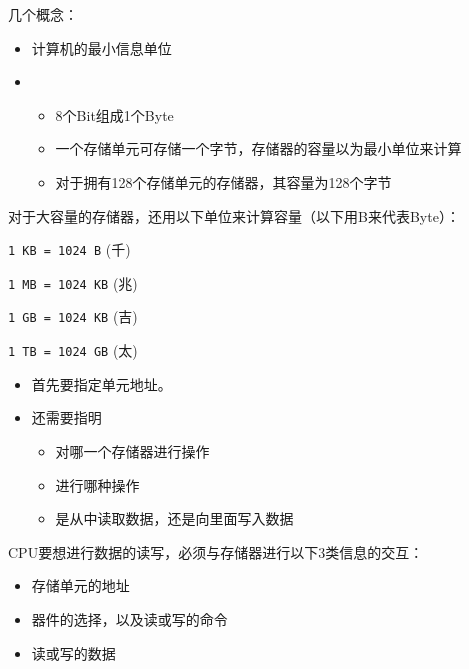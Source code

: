\begin{frame}

几个概念：

\begin{itemize}
	\item {} \quad 计算机的最小信息单位 \\[.1in]
	\item {} \\[.1in]
	\begin{itemize}
		\item   8个Bit组成1个Byte \\[.1in]
		\item   一个存储单元可存储一个字节，存储器的容量以为最小单位来计算 \\[.1in]
		\item   对于拥有128个存储单元的存储器，其容量为128个字节
	\end{itemize}
	
\end{itemize}
 
对于大容量的存储器，还用以下单位来计算容量（以下用B来代表Byte）：
\begin{AutoMultiColItemize}
\item \lstinline|1 KB = 1024 B|   (千)
\item \lstinline|1 MB = 1024 KB|  (兆)
\item \lstinline|1 GB = 1024 KB|  (吉)
\item \lstinline|1 TB = 1024 GB|  (太)
\end{AutoMultiColItemize}
\end{frame}
%
\begin{frame}
\begin{itemize}
\item 首先要指定单元地址。\\[0.1in]
\item 还需要指明\\[0.1in]
\begin{itemize}
	\item 对哪一个存储器进行操作\\[0.1in]
	\item 进行哪种操作\\[0.1in]
	\item 是从中读取数据，还是向里面写入数据
\end{itemize}

\end{itemize}
\end{frame}
%
\begin{frame}
CPU要想进行数据的读写，必须与存储器进行以下3类信息的交互： 

\begin{itemize}
\item {} \quad 存储单元的地址\\[0.1in]
\item {} \quad 器件的选择，以及读或写的命令\\[0.1in]
\item {} \quad 读或写的数据 

\end{itemize}
\end{frame}
